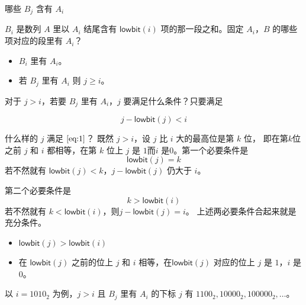 \documentclass{ctexbeamer}
\newcommand{\lb}{\mathsf{lowbit}}
\begin{document}
\begin{frame}{哪些 $B_j$ 含有 $A_i$}

$B_i$ 是数列 $A$ 里以 $A_i$ 结尾含有 $\lb(i)$ 项的那一段之和。固定 $A_i$，$B$ 的哪些项对应的段里有 $A_i$？
\begin{itemize}
    \item $B_i$ 里有 $A_i$。
    \item 若 $B_j$ 里有 $A_i$ 则 $j \ge i$。
\end{itemize}

对于 $j > i$，若要 $B_j$ 里有 $A_i$，$j$ 要满足什么条件？只要满足

\begin{equation}
    j - \lb(j) < i \label{eq:1}
\end{equation}

\begin{block}{什么样的 $j$ 满足 $\eqref{eq:1}$？}
  既然 $j > i$，设 $j$ 比 $i$ 大的最高位是第 $k$ 位，
 即在第$k$位之前 $j$ 和 $i$ 都相等，在第 $k$ 位上 $j$ 是 $1$而$i$ 是$0$。第一个必要条件是
 \[\lb(j) = k\]
若不然就有 $\lb(j) < k$，$j - \lb(j)$ 仍大于 $i$。
\end{block}

\end{frame}


\begin{frame}{}
第二个必要条件是
\[k > \lb(i)\]
若不然就有  $k < \lb(i)$，则$j - \lb(j) = i$。
上述两必要条件合起来就是充分条件。
\begin{tcolorbox}
  \begin{itemize}
      \item $\lb(j) > \lb(i)$
      \item 在 $\lb(j)$ 之前的位上 $j$ 和 $i$ 相等，在$\lb(j)$ 对应的位上 $j$ 是 $1$，$i$ 是$0$。
  \end{itemize}
\end{tcolorbox}
以 $i = 1010_2$ 为例，$j > i$ 且 $B_j$ 里有 $A_i$ 的下标 $j$ 有 $1100_2, 10000_2, 100000_2, \dots$。
\end{frame}
\end{document}
